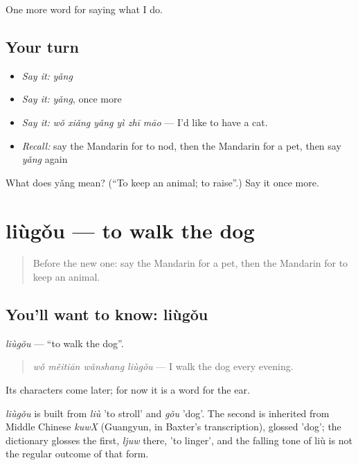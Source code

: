 \begin{grammarlens}[title={What you've built}]
One more word for saying what I do.
\end{grammarlens}

\subsection*{Your turn}
\begin{itemize}
\raggedright
  \item \emph{Say it:} \emph{yǎng}
  \item \emph{Say it:} \emph{yǎng}, once more
  \item \emph{Say it:} \emph{wǒ xiǎng yǎng yì zhī māo} — I'd like to have a cat.
  \item \emph{Recall:} say the Mandarin for to nod, then the Mandarin for a pet, then say \emph{yǎng} again
\end{itemize}

\begin{tcolorbox}[breakable,colback=teal!4,colframe=teal!35!black,title={Before you move on}]
What does yǎng mean? (\textquotedblleft{}To keep an animal; to raise\textquotedblright{}.) Say it once more.
\end{tcolorbox}
\section[liùgǒu]{liùgǒu — to walk the dog}

\label{lesson:ZH-C229-liugou}



\begin{quote}
Before the new one: say the Mandarin for a pet, then the Mandarin for to keep an animal.
\end{quote}

\subsection*{You'll want to know: liùgǒu}
\emph{liùgǒu} — \textquotedblleft{}to walk the dog\textquotedblright{}.

\begin{quote}
\emph{wǒ měitiān wǎnshang liùgǒu} — I walk the dog every evening.
\end{quote}

Its characters come later; for now it is a word for the ear.

\begin{cousinweb}
\emph{liùgǒu} is built from \emph{liù} 'to stroll' and \emph{gǒu} 'dog'. The second is inherited from Middle Chinese \emph{kuwX} (Guangyun, in Baxter's transcription), glossed 'dog'; the dictionary glosses the first, \emph{ljuw} there, 'to linger', and the falling tone of liù is not the regular outcome of that form.
\end{cousinweb}

